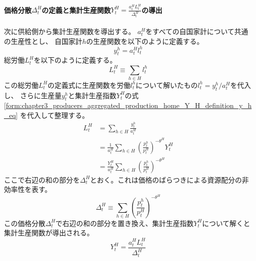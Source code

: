 \paragraph{価格分散\(\Delta_t^H\)の定義と集計生産関数\(Y_t^H=\frac{a_t^HL_t^H}{\Delta_t^H}\)の導出}
\label{sec:chapter3_producers_aggregated_production_home_aggregated_production_function_derivation}
次に供給側から集計生産関数を導出する。
\(a_t^H\)をすべての自国家計について共通の生産性とし、
自国家計\(h\)の生産関数を以下のように定義する。
\begin{equation}
\label{form:chapter3_producers_aggregated_production_home_aggregated_production_function_derivation_y_h_def}
    y_t^h=a_t^Hl_t^h
\end{equation}
総労働\(L_t^H\)を以下のように定義する。
\begin{equation}
\label{form:chapter3_producers_aggregated_production_home_aggregated_production_function_derivation_L_H_def}
    L_t^H\equiv\sum_{h\in H}l_t^h
\end{equation}
この総労働\(L_t^H\)の定義式に生産関数を労働\(l_t^h\)について解いたもの\(l_t^h=y_t^h/a_t^H\)を代入し、
さらに生産量\(y_t^h\)と集計生産指数\(Y_t^H\)の式
\eqref{form:chapter3_producers_aggregated_production_home_Y_H_definition_y_h_eq}
を代入して整理する。
\begin{align}
\label{form:chapter3_producers_aggregated_production_home_aggregated_production_function_derivation_L_H_eq}
    L_t^H&=\sum_{h\in H}\frac{y_t^h}{a_t^H} \nonumber \\
    &=\frac{1}{a_t^H}\sum_{h\in H}\left(\frac{p_t^h}{p_t^H}\right)^{-\theta^H}Y_t^H \nonumber \\
    &=\frac{Y_t^H}{a_t^H}\sum_{h\in H}\left(\frac{p_t^h}{p_t^H}\right)^{-\theta^H}
\end{align}
ここで右辺の和の部分を\(\Delta_t^H\)とおく。これは価格のばらつきによる資源配分の非効率性を表す。
\begin{equation}
\label{form:chapter3_producers_aggregated_production_home_aggregated_production_function_derivation_Delta_H_def}
    \Delta_t^H\equiv\sum_{h\in H}\left(\frac{p_t^h}{p_t^H}\right)^{-\theta^H}
\end{equation}
この価格分散\(\Delta_t^H\)で右辺の和の部分を置き換え、集計生産指数\(Y_t^H\)について解くと
集計生産関数が導出される。
\begin{equation}
\label{form:chapter3_producers_aggregated_production_home_aggregated_production_function_derivation_Y_H_eq}
    Y_t^H=\frac{a_t^HL_t^H}{\Delta_t^H}
\end{equation}

